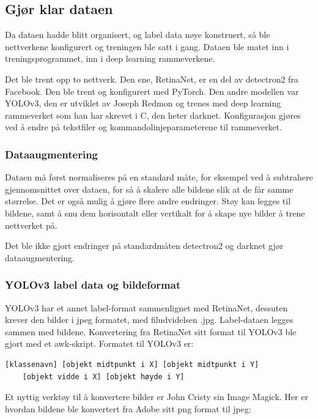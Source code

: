 \subsection{Gjør klar dataen}

Da dataen hadde blitt organisert, og label data nøye konstruert, så ble nettverkene konfigurert og treningen ble satt i gang. Dataen ble matet inn i treningsprogrammet, inn i deep learning rammeverkene.

Det ble trent opp to nettverk. Den ene, RetinaNet, er en del av detectron2 fra Facebook. Den ble trent og konfigurert med PyTorch. Den andre modellen var YOLOv3, den er utviklet av Joseph Redmon og trenes med deep learning rammeverket som han har skrevet i C, den heter darknet. Konfigurasjon gjøres ved å endre på tekstfiler og kommandolinjeparameterene til rammeverket.

\subsubsection{Dataaugmentering}

Dataen må først normaliseres på en standard måte, for eksempel ved å subtrahere gjennomsnittet over dataen, for så å skalere alle bildene slik at de får samme størrelse. Det er også mulig å gjøre flere andre endringer. Støy kan legges til bildene, samt å snu dem horisontalt eller vertikalt for å skape nye bilder å trene nettverket på.

Det ble ikke gjort endringer på standardmåten detectron2 og darknet gjør dataaugmentering.

\subsubsection{YOLOv3 label data og bildeformat}

YOLOv3 har et annet label-format sammenlignet med RetinaNet, dessuten krever den bilder i jpeg formatet, med filudvidelsen .jpg. Label-dataen legges sammen med bildene. Konvertering fra RetinaNet sitt format til YOLOv3 ble gjort med et awk-skript. Formatet til YOLOv3 er:

\begin{verbatim}
[klassenavn] [objekt midtpunkt i X] [objekt midtpunkt i Y]
	[objekt vidde i X] [objekt høyde i Y]
\end{verbatim}

Et nyttig verktøy til å konvertere bilder er John Cristy sin Image Magick. Her er hvordan bildene ble konvertert fra Adobe sitt png format til jpeg:

